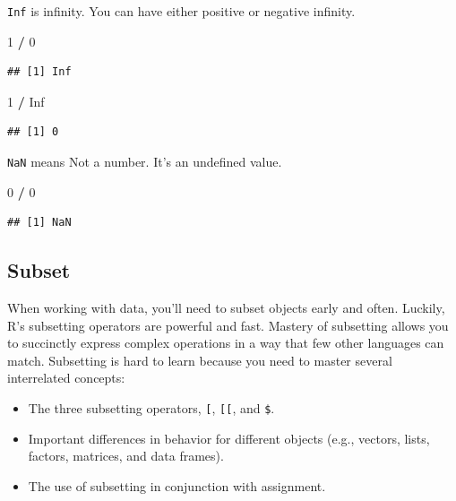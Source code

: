 \documentclass[
]{book}
\newenvironment{Shaded}{\begin{snugshade}}{\end{snugshade}}
\newcommand{\ConstantTok}[1]{\textcolor[rgb]{0.56,0.35,0.01}{#1}}
\newcommand{\DecValTok}[1]{\textcolor[rgb]{0.00,0.00,0.81}{#1}}
\newcommand{\SpecialCharTok}[1]{\textcolor[rgb]{0.81,0.36,0.00}{\textbf{#1}}}
\begin{document}
\texttt{Inf} is infinity. You can have either positive or negative infinity.

\begin{Shaded}
\begin{Highlighting}[]
\DecValTok{1} \SpecialCharTok{/} \DecValTok{0}
\end{Highlighting}
\end{Shaded}

\begin{verbatim}
## [1] Inf
\end{verbatim}

\begin{Shaded}
\begin{Highlighting}[]
\DecValTok{1} \SpecialCharTok{/} \ConstantTok{Inf}
\end{Highlighting}
\end{Shaded}

\begin{verbatim}
## [1] 0
\end{verbatim}

\texttt{NaN} means Not a number. It's an undefined value.

\begin{Shaded}
\begin{Highlighting}[]
\DecValTok{0} \SpecialCharTok{/} \DecValTok{0}
\end{Highlighting}
\end{Shaded}

\begin{verbatim}
## [1] NaN
\end{verbatim}

\subsection{Subset}\label{subset}

When working with data, you'll need to subset objects early and often. Luckily, R's subsetting operators are powerful and fast. Mastery of subsetting allows you to succinctly express complex operations in a way that few other languages can match. Subsetting is hard to learn because you need to master several interrelated concepts:

\begin{itemize}
\item
  The three subsetting operators, \texttt{{[}}, \texttt{{[}{[}}, and \texttt{\$}.
\item
  Important differences in behavior for different objects (e.g., vectors, lists, factors, matrices, and data frames).
\item
  The use of subsetting in conjunction with assignment.
\end{itemize}
\end{document}
